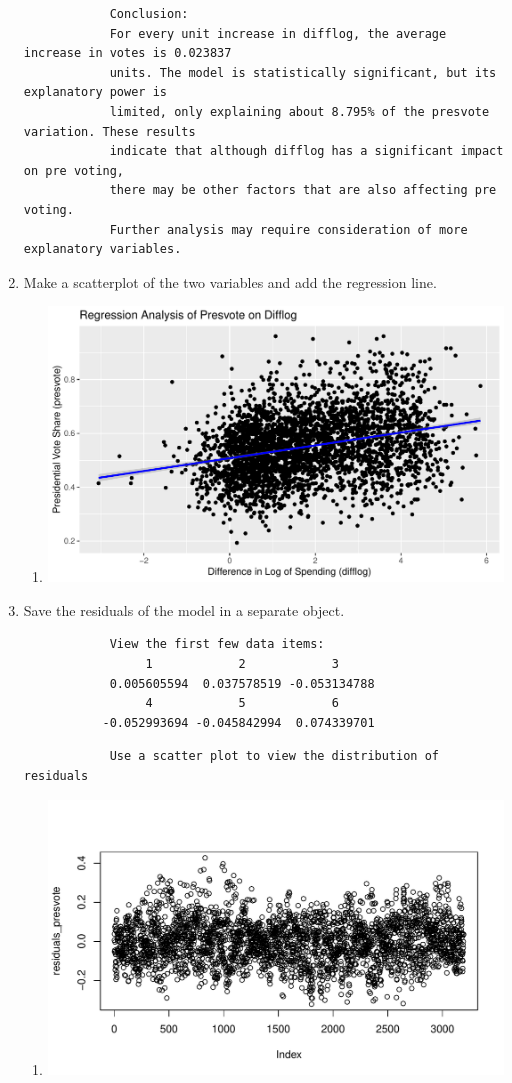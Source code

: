 \documentclass[12pt,letterpaper]{article}
\begin{document}
\begin{enumerate}
\begin{verbatim}
			Conclusion:
			For every unit increase in difflog, the average increase in votes is 0.023837 
			units. The model is statistically significant, but its explanatory power is 
			limited, only explaining about 8.795% of the presvote variation. These results 
			indicate that although difflog has a significant impact on pre voting, 
			there may be other factors that are also affecting pre voting. 
			Further analysis may require consideration of more explanatory variables.
		\end{verbatim}
		\vspace{1cm}
		\item Make a scatterplot of the two variables and add the regression line. 	
		
		\begin{enumerate}
			\item[]
			\includegraphics[width=.70\textwidth]{my_answers_question2.2_plot.pdf}
		\end{enumerate}
		\vspace{5cm}
		\item Save the residuals of the model in a separate object.
		
		\begin{verbatim}
			View the first few data items:
			     1            2            3
			0.005605594  0.037578519 -0.053134788            
			     4            5            6 
		   -0.052993694 -0.045842994  0.074339701  
		\end{verbatim}
		\begin{verbatim}
			Use a scatter plot to view the distribution of residuals
		\end{verbatim}
		\begin{enumerate}
			\item[]
			\includegraphics[width=.70\textwidth]{my_answers_question2.3_plot.pdf}

\end{enumerate}
\end{enumerate}
\end{document}
